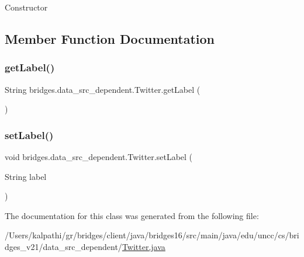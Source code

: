 Constructor 

\subsection{Member Function Documentation}
\hypertarget{classbridges_1_1data__src__dependent_1_1_twitter_ac7d7ac0808192702bc4a1a790237da8b}{}\label{classbridges_1_1data__src__dependent_1_1_twitter_ac7d7ac0808192702bc4a1a790237da8b} 
\subsubsection{\texorpdfstring{get\+Label()}{getLabel()}}
{\footnotesize\ttfamily String bridges.\+data\+\_\+src\+\_\+dependent.\+Twitter.\+get\+Label (\begin{DoxyParamCaption}{ }\end{DoxyParamCaption})}

\hypertarget{classbridges_1_1data__src__dependent_1_1_twitter_a4d7d3a015d66029f373d5c8e41659242}{}\label{classbridges_1_1data__src__dependent_1_1_twitter_a4d7d3a015d66029f373d5c8e41659242} 
\subsubsection{\texorpdfstring{set\+Label()}{setLabel()}}
{\footnotesize\ttfamily void bridges.\+data\+\_\+src\+\_\+dependent.\+Twitter.\+set\+Label (\begin{DoxyParamCaption}\item[{String}]{label }\end{DoxyParamCaption})}



The documentation for this class was generated from the following file\+:\begin{DoxyCompactItemize}
\item 
/\+Users/kalpathi/gr/bridges/client/java/bridges16/src/main/java/edu/uncc/cs/bridges\+\_\+v21/data\+\_\+src\+\_\+dependent/\hyperlink{_twitter_8java}{Twitter.\+java}\end{DoxyCompactItemize}
